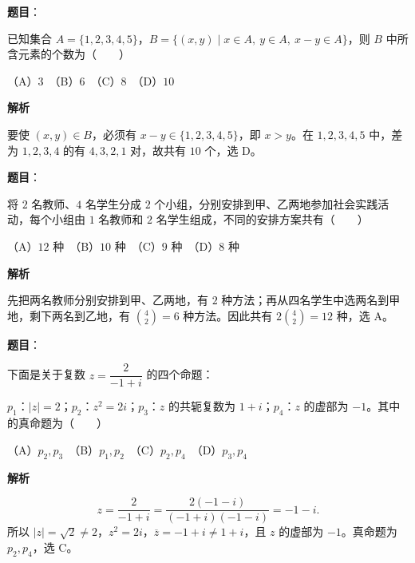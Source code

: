 

\begin{answer}

\textbf{题目}：

已知集合 $A=\{1,2,3,4,5\}$，$B=\{(x,y)\mid x\in A,\ y\in A,\ x-y\in A\}$，则 $B$ 中所含元素的个数为\mbox{（　　）}

（A）$3$　（B）$6$　（C）$8$　（D）$10$

\textbf{解析}

要使 $(x,y)\in B$，必须有 $x-y\in\{1,2,3,4,5\}$，即 $x>y$。在 $1,2,3,4,5$ 中，差为 $1,2,3,4$ 的有 $4,3,2,1$ 对，故共有 $10$ 个，选 D。


\end{answer}
\begin{answer}

\textbf{题目}：

将 $2$ 名教师、$4$ 名学生分成 $2$ 个小组，分别安排到甲、乙两地参加社会实践活动，每个小组由 $1$ 名教师和 $2$ 名学生组成，不同的安排方案共有\mbox{（　　）}

（A）$12$ 种　（B）$10$ 种　（C）$9$ 种　（D）$8$ 种

\textbf{解析}

先把两名教师分别安排到甲、乙两地，有 $2$ 种方法；再从四名学生中选两名到甲地，剩下两名到乙地，有 $\binom42=6$ 种方法。因此共有 $2\binom42=12$ 种，选 A。


\end{answer}
\begin{answer}

\textbf{题目}：

下面是关于复数 $z=\dfrac{2}{-1+i}$ 的四个命题：

$p_1$：$|z|=2$；$p_2$：$z^2=2i$；$p_3$：$z$ 的共轭复数为 $1+i$；$p_4$：$z$ 的虚部为 $-1$。其中的真命题为\mbox{（　　）}

（A）$p_2,p_3$　（B）$p_1,p_2$　（C）$p_2,p_4$　（D）$p_3,p_4$

\textbf{解析}

\nopagebreak[4]
\[
z=\frac{2}{-1+i}=\frac{2(-1-i)}{(-1+i)(-1-i)}=-1-i.
\]
所以 $|z|=\sqrt2\ne2$，$z^2=2i$，$\overline z=-1+i\ne1+i$，且 $z$ 的虚部为 $-1$。真命题为 $p_2,p_4$，选 C。


\end{answer}
